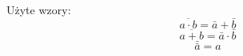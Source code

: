 \documentclass[12pt,a4paper]{report}
\begin{document}
	Użyte wzory:
	\begin{equation}
	\overline{a\cdot b}=\bar{a}+\bar{b}
	\end{equation}
	\begin{equation}
	\overline{a+b}=\bar{a}\cdot\bar{b}
	\end{equation}
	\begin{equation}
	\bar{\bar{a}}=a
	\end{equation}
	
	
	
	
	
\end{document}
